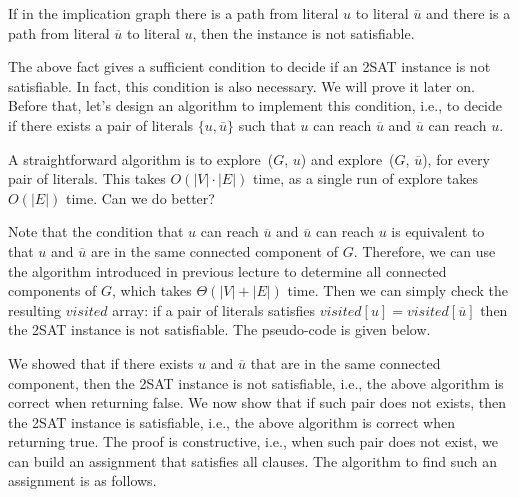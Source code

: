 \begin{fact}
If in the implication graph there is a path from literal $u$ to literal $\overline{u}$ and there is a
path from literal $\overline{u}$ to literal $u$, then the instance is not satisfiable.
\end{fact}

The above fact gives a sufficient condition to decide if an 2SAT instance is not satisfiable.
In fact, this condition is also necessary. We will prove it later on.
Before that, let's design an algorithm to implement this condition, i.e., to decide if there
exists a pair of literals $\{u,\overline{u}\}$ such that $u$ can reach $\overline{u}$ and $\overline{u}$ can reach $u$.

A straightforward algorithm is to explore~($G$, $u$) and explore~($G$, $\overline{u}$), for every pair of literals.
This takes $O(|V|\cdot |E|)$ time, as a single run of explore takes $O(|E|)$ time. Can we do better?

Note that the condition that $u$ can reach $\overline{u}$ and $\overline{u}$ can reach $u$
is equivalent to that $u$ and $\overline{u}$ are in the same connected component of $G$.
Therefore, we can use the algorithm introduced in previous lecture to determine all connected components of $G$, which takes $\Theta(|V| + |E|)$ time.
Then we can simply check the resulting $visited$ array: if a pair of literals satisfies $visited[u] = visited[\overline{u}]$ then the 2SAT instance is not satisfiable.
The pseudo-code is given below.

\begin{algorithmblock}[0.8\textwidth]
	\xxx
	\xxx
	\xxx
	\xxx
	\xxx
	\xxx
\end{algorithmblock}

We showed that if there exists $u$ and $\overline{u}$ that are in the same connected
component, then the 2SAT instance is not satisfiable, i.e., the above
algorithm is correct when returning false.  We now show that if such
pair does not exists, then the 2SAT instance is satisfiable, i.e., the
above algorithm is correct when returning true.
The proof is constructive, i.e., when such pair does not exist, we can
build an assignment that satisfies all clauses.
The algorithm to find such an assignment is as follows. %

